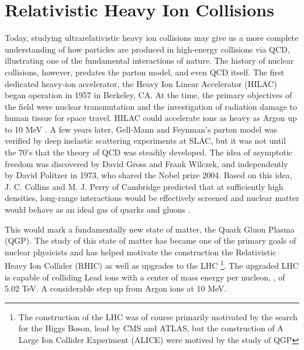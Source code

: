 \section{Relativistic Heavy Ion Collisions}\label{sec:rhics}
Today, studying ultrarelativistic heavy ion collisions may give us a more complete understanding of how particles are produced in high-energy collisions via QCD, illustrating one of the fundamental interactions of nature. The history of nuclear collisions, however, predates the parton model, and even QCD itself. The first dedicated heavy-ion accelerator, the Heavy Ion Linear Accelerator (HILAC) began operation in 1957 in Berkeley, CA. At the time, the primary objectives of the field were nuclear transmutation and the investigation of radiation damage to human tissue for space travel. HILAC could accelerate ions as heavy as Argon up to 10 MeV \cite{AIP2014}. A few years later, Gell-Mann and Feynman's parton model was verified by deep inelastic scattering experiments at SLAC, but it was not until the 70's that the theory of QCD was steadily developed. The idea of asymptotic freedom was discovered by David Gross and Frank Wilczek, and independently by David Politzer in 1973, who shared the Nobel prize 2004. Based on this idea, J. C. Collins and M. J. Perry of Cambridge predicted that at sufficiently high densities, long-range interactions would be effectively screened and nuclear matter would behave as an ideal gas of quarks and gluons \cite{Collins1975}. %

This would mark a fundamentally new state of matter, the Quark Gluon Plasma (QGP). The study of this state of matter has became one of the primary goals of nuclear physicists and has helped motivate the construction the Relativistic Heavy Ion Collider (RHIC) as well as upgrades to the LHC \footnote{The construction of the LHC was of course primarily motivated by the search for the Higgs Boson, lead by CMS and ATLAS, but the construction of A Large Ion Collider Experiment (ALICE) were motived by the study of QGP}. The upgraded LHC is capable of colliding Lead ions with a center of mass energy per nucleon, \sqrtsNN, of 5.02 TeV. A considerable step up from Argon ions at 10 MeV. 


